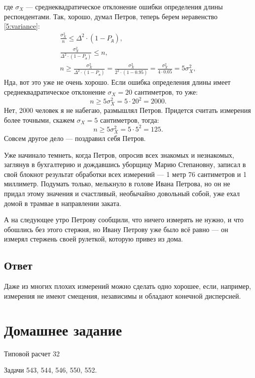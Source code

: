 \documentclass[a4paper,12pt]{article}
\begin{document}
    где $\sigma_X$ --- среднеквадратическое отклонение ошибки определения длины респондентами. Так, хорошо, думал Петров, теперь берем неравенство \eqref{5:variance}:
    \begin{gather}
        \frac{\sigma_X^2}{n} \le \Delta^2 \cdot \left ( 1 - P_\text{д} \right ) , \\
        \frac{\sigma_X^2}{\Delta^2 \cdot \left ( 1 - P_\text{д} \right )} \le n , \\
        n \ge \frac{\sigma_X^2}{\Delta^2 \cdot \left ( 1 - P_\text{д} \right )} = \frac{\sigma_X^2}{2^2 \cdot \left ( 1 - 0.95 \right )} = \frac{\sigma_X^2}{4 \cdot 0.05} = 5 \sigma_X^2,
    \end{gather}
    Нда, вот это уже не очень хорошо. Если ошибка определения длины имеет среднеквадратическое отклонение $\sigma_X = 20$ сантиметров, то уже:
    \begin{equation}
        n \ge 5 \sigma_X^2 = 5 \cdot 20^2 = 2000.
    \end{equation}
    Нет, 2000 человек я не набегаю, размышлял Петров. Придется считать измерения более точными, скажем $\sigma_X = 5$ сантиметров, тогда:
    \begin{equation}
        n \ge 5 \sigma_X^2 = 5 \cdot 5^2 = 125.
    \end{equation}
    Совсем другое дело --- поздравил себя Петров.

    Уже начинало темнеть, когда Петров, опросив всех знакомых и незнакомых, заглянув в бухгалтерию и дождавшись уборщицу Марию Степановну, записал в свой блокнот результат
    обработки всех измерений --- 1 метр 76 сантиметров и 1 миллиметр. Подумать только, мелькнуло в голове Ивана Петрова, но он не придал этому значения и счастливый, необычайно
    довольный собой, уже ехал домой в трамвае в направлении заката.

    А на следующее утро Петрову сообщили, что ничего измерять не нужно, и что обошлись без этого стержня, но Ивану Петрову уже было всё равно --- он измерял стержень
    своей рулеткой, которую привез из дома.

    \subsection*{Ответ}
    Даже из многих плохих измерений можно сделать одно хорошее, если, например, измерения не имеют смещения, независимы и обладают конечной дисперсией.


    \section{Домашнее задание}
    Типовой расчет 32

    Задачи 543, 544, 546, 550, 552.
\end{document}
